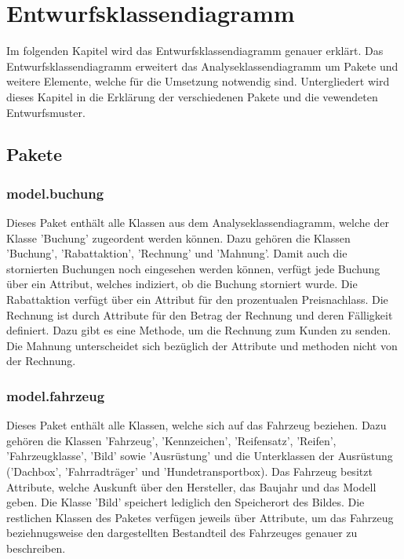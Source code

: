 \chapter{Entwurfsklassendiagramm}

Im folgenden Kapitel wird das Entwurfsklassendiagramm genauer erklärt. Das Entwurfsklassendiagramm erweitert das Analyseklassendiagramm um Pakete und weitere Elemente, welche für die Umsetzung notwendig sind. Untergliedert wird dieses Kapitel in die Erklärung der verschiedenen Pakete und die vewendeten Entwurfsmuster.

\section{Pakete}

\subsection{model.buchung}

Dieses Paket enthält alle Klassen aus dem Analyseklassendiagramm, welche der Klasse 'Buchung' zugeordent werden können. Dazu gehören die Klassen 'Buchung', 'Rabattaktion', 'Rechnung' und 'Mahnung'. Damit auch die stornierten Buchungen noch eingesehen werden können, verfügt jede Buchung über ein Attribut, welches indiziert, ob die Buchung storniert wurde. Die Rabattaktion verfügt über ein Attribut für den prozentualen Preisnachlass. Die Rechnung ist durch Attribute für den Betrag der Rechnung und deren Fälligkeit definiert. Dazu gibt es eine Methode, um die Rechnung zum Kunden zu senden. Die Mahnung unterscheidet sich bezüglich der Attribute und methoden nicht von der Rechnung.

\subsection{model.fahrzeug}

Dieses Paket enthält alle Klassen, welche sich auf das Fahrzeug beziehen. Dazu gehören die Klassen 'Fahrzeug', 'Kennzeichen', 'Reifensatz', 'Reifen', 'Fahrzeugklasse', 'Bild' sowie 'Ausrüstung' und die Unterklassen der Ausrüstung ('Dachbox', 'Fahrradträger' und 'Hundetransportbox).
Das Fahrzeug besitzt Attribute, welche Auskunft über den Hersteller, das Baujahr und das Modell geben. Die Klasse 'Bild' speichert lediglich den Speicherort des Bildes. Die restlichen Klassen des Paketes verfügen jeweils über Attribute, um das Fahrzeug beziehnugsweise den dargestellten Bestandteil des Fahrzeuges genauer zu beschreiben. 


